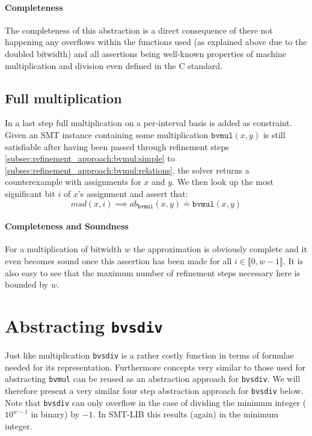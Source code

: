 \paragraph{Completeness}
The completeness of this abstraction is a direct consequence of there not happening any overflows within the functions used (as explained above due to the doubled bitwidth)
and all assertions being well-known properties of machine multiplication and division even defined in the C standard.

\subsection{Full multiplication}
\label{subsec:refinement_approach:bvmul:fullmul}
In a last step full multiplication on a per-interval basis is added as constraint.
Given an SMT instance containing some multiplication $\texttt{bvmul}\left(x,y\right)$ is still satisfiable after having been passed through refinement steps
\ref{subsec:refinement_approach:bvmul:simple} to \ref{subsec:refinement_approach:bvmul:relations}, the solver returns a counterexample with assignments for $x$ and $y$.
We then look up the most significant bit $i$ of $x$'s assignment and assert that:
\[
    msd\left(x,i\right) \implies ab_{\texttt{bvmul}}\left(x,y\right) \doteq \texttt{bvmul}\left(x,y\right)
\]
\paragraph{Completeness and Soundness}
For a multiplication of bitwidth $w$ the approximation is obviously complete and it even becomes sound once this assertion has been made
for all $i\in\llbracket 0,w-1\rrbracket$. It is also easy to see that the maximum number of refinement steps necessary here is bounded by $w$.

\section{Abstracting \texttt{bvsdiv}}
Just like multiplication \texttt{bvsdiv} is a rather costly function in terms of formulae needed for its representation.
Furthermore concepts very similar to those used for abstracting \texttt{bvmul} can be reused as an abstraction approach for \texttt{bvsdiv}.
We will therefore present a very similar four step abstraction approach for \texttt{bvsdiv} below.\\
Note that \texttt{bvsdiv} can only overflow in the case of dividing the minimum integer ($10^{w-1}$ in binary) by $-1$.
In SMT-LIB this results (again) in the minimum integer.

